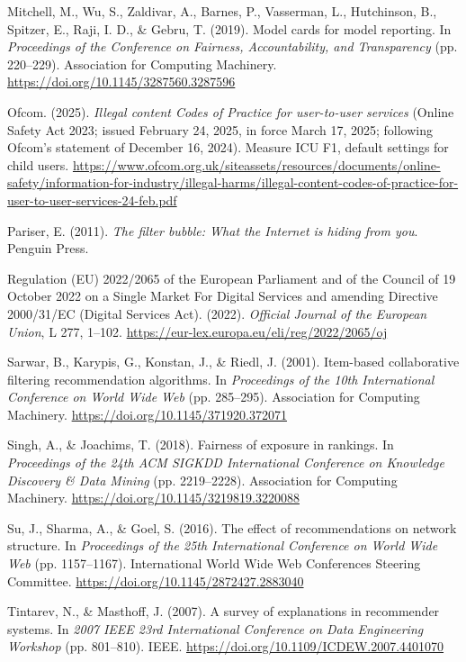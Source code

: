 \documentclass[11pt,letterpaper]{article}
\newenvironment{references}
  {\par\small\raggedright\setlength{\parskip}{3pt plus 1pt}\setlength{\parindent}{0pt}}
  {\par}
\newcommand{\refentry}{\par\noindent\hangindent=0.3in\hangafter=1\relax}
\begin{document}
\begin{references}
\refentry Mitchell, M., Wu, S., Zaldivar, A., Barnes, P., Vasserman, L., Hutchinson, B., Spitzer, E., Raji, I.
D., \& Gebru, T. (2019). Model cards for model reporting. In \textit{Proceedings of the Conference on
Fairness, Accountability, and Transparency} (pp. 220--229). Association for Computing Machinery.
\url{https://doi.org/10.1145/3287560.3287596}

\refentry Ofcom. (2025). \textit{Illegal content Codes of Practice for user-to-user services} (Online Safety
Act 2023; issued February 24, 2025, in force March 17, 2025; following Ofcom's statement of December 16,
2024). Measure ICU F1, default settings for child users.
\url{https://www.ofcom.org.uk/siteassets/resources/documents/online-safety/information-for-industry/illegal-harms/illegal-content-codes-of-practice-for-user-to-user-services-24-feb.pdf}

\refentry Pariser, E. (2011). \textit{The filter bubble: What the Internet is hiding from you}. Penguin Press.

\refentry Regulation (EU) 2022/2065 of the European Parliament and of the Council of 19 October 2022 on a
Single Market For Digital Services and amending Directive 2000/31/EC (Digital Services Act). (2022).
\textit{Official Journal of the European Union}, L 277, 1--102.
\url{https://eur-lex.europa.eu/eli/reg/2022/2065/oj}

\refentry Sarwar, B., Karypis, G., Konstan, J., \& Riedl, J. (2001). Item-based collaborative filtering
recommendation algorithms. In \textit{Proceedings of the 10th International Conference on World Wide Web} (pp.
285--295). Association for Computing Machinery. \url{https://doi.org/10.1145/371920.372071}

\refentry Singh, A., \& Joachims, T. (2018). Fairness of exposure in rankings. In \textit{Proceedings of the
24th ACM SIGKDD International Conference on Knowledge Discovery \& Data Mining} (pp. 2219--2228). Association
for Computing Machinery. \url{https://doi.org/10.1145/3219819.3220088}

\refentry Su, J., Sharma, A., \& Goel, S. (2016). The effect of recommendations on network structure. In
\textit{Proceedings of the 25th International Conference on World Wide Web} (pp. 1157--1167). International
World Wide Web Conferences Steering Committee. \url{https://doi.org/10.1145/2872427.2883040}

\refentry Tintarev, N., \& Masthoff, J. (2007). A survey of explanations in recommender systems. In
\textit{2007 IEEE 23rd International Conference on Data Engineering Workshop} (pp. 801--810). IEEE.
\url{https://doi.org/10.1109/ICDEW.2007.4401070}


\end{references}
\end{document}
